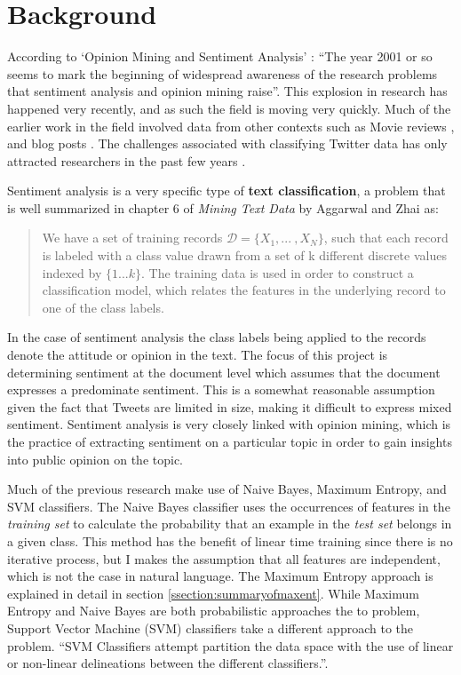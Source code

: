 \documentclass[final,3p,12pt]{elsarticle}
\begin{document}
\section{Background}
\label{section:background}

According to `Opinion Mining and Sentiment Analysis' \cite{Pang2008}: ``The
year 2001 or so seems to mark the beginning of widespread awareness of the
research problems that sentiment analysis and opinion mining raise''. This
explosion in research has happened very recently, and as such the field is
moving very quickly. Much of the earlier work in the field involved data from
other contexts such as Movie reviews \cite{Pang2002}, and blog posts
\cite{Melville2009}. The challenges associated with classifying Twitter data
has only attracted researchers in the past few years \cite{Jianfeng2013}
\cite{Barbosa2010} \cite{Gokulakrishnan2012}.

Sentiment analysis is a very specific type of \textbf{text classification}, a
problem that is well summarized in chapter 6 of \textit{Mining Text Data} by
Aggarwal and Zhai \cite{Aggarwal2012} as:

\begin{quote}
    We have a set of training records $\mathcal{D} = \{X_{1} , . . .\ , X_{N}
    \}$, such that each record is labeled with a class value drawn from a set
    of k different discrete values indexed by $\{1 . . . k\}$. The training
    data is used in order to construct a classification model, which relates
    the features in the underlying record to one of the class labels.
\end{quote}

In the case of sentiment analysis the class labels being applied to the records
denote the attitude or opinion in the text. The focus of this project is
determining sentiment at the document level which assumes that the document
expresses a predominate sentiment. This is a somewhat reasonable assumption
given the fact that Tweets are limited in size, making it difficult to express
mixed sentiment. Sentiment analysis is very closely linked with opinion mining,
which is the practice of extracting sentiment on a particular topic in order to
gain insights into public opinion on the topic.

Much of the previous research make use of Naive Bayes, Maximum Entropy, and
SVM classifiers. The Naive Bayes classifier uses the occurrences of features in
the \textit{training set} to calculate the probability that an example in the
\textit{test set} belongs in a given class. This method has the benefit of
linear time training since there is no iterative process, but I makes the
assumption that all features are independent, which is not the case in natural
language. The Maximum Entropy approach is explained in detail in section
\ref{ssection:summaryofmaxent}. While Maximum Entropy and Naive Bayes are both
probabilistic approaches the to problem, Support Vector Machine (SVM)
classifiers take a different approach to the problem. ``SVM Classifiers attempt
partition the data space with the use of linear or non-linear delineations
between the different classifiers.''\cite{Aggarwal2012}.
\end{document}
